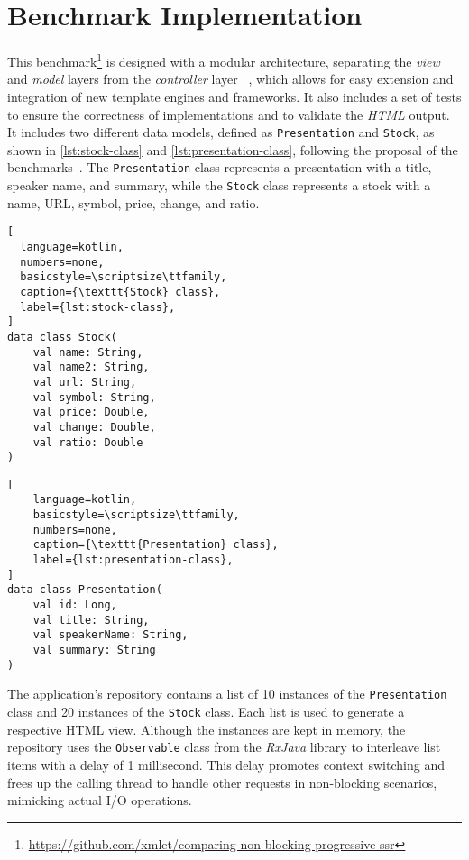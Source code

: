 \section{Benchmark Implementation}
\label{sec:bench}

This benchmark\footnote{\url{https://github.com/xmlet/comparing-non-blocking-progressive-ssr}}
is designed with a modular architecture, separating the \textit{view} and
\textit{model} layers from the \textit{controller} layer ~\cite{Bucanek2009},
which allows for easy extension and integration of new template engines and
frameworks. It also includes a set of tests to ensure the correctness of
implementations and to validate the \textit{HTML} output. It includes two
different data models, defined as \texttt{Presentation} and \texttt{Stock}, as
shown in \autoref{lst:stock-class} and \autoref{lst:presentation-class}, 
following the proposal of the benchmarks~\cite{templatesbenchmark,springbenchmark}.
The \texttt{Presentation} class represents a presentation with a title, speaker
name, and summary, while the \texttt{Stock} class represents a stock with a
name, URL, symbol, price, change, and ratio.

\begin{center}
      \begin{minipage}{0.48\textwidth}
            \begin{lstlisting}[
  language=kotlin,
  numbers=none,
  basicstyle=\scriptsize\ttfamily,
  caption={\texttt{Stock} class},
  label={lst:stock-class},
]
data class Stock(
    val name: String,
    val name2: String,
    val url: String,
    val symbol: String,
    val price: Double, 
    val change: Double, 
    val ratio: Double
)
\end{lstlisting}
\end{minipage}
\hfill
\begin{minipage}{0.48\textwidth}
  \begin{lstlisting}[
    language=kotlin,
    basicstyle=\scriptsize\ttfamily,
    numbers=none,
    caption={\texttt{Presentation} class},
    label={lst:presentation-class},
]
data class Presentation(
    val id: Long,
    val title: String, 
    val speakerName: String,
    val summary: String
)
\end{lstlisting}
\end{minipage}
\end{center}

The application's repository contains a list of 10 instances of the
\texttt{Presentation} class and 20 instances of the \texttt{Stock} class. Each
list is used to generate a respective HTML view. Although the instances are
kept in memory, the repository uses the \texttt{Observable} class from the
\textit{RxJava} library to interleave list items with a delay of 1 millisecond.
This delay promotes context switching and frees up the calling thread to handle
other requests in non-blocking scenarios, mimicking actual I/O operations.

